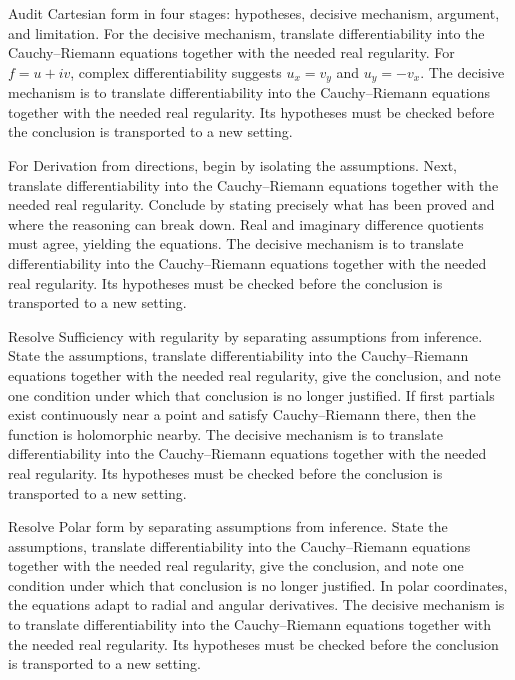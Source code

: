 \begin{example}\label{ex:iv02-worked-01}
Audit Cartesian form in four stages: hypotheses, decisive mechanism, argument, and limitation. For the decisive mechanism, translate differentiability into the Cauchy--Riemann equations together with the needed real regularity. For $f=u+iv$, complex differentiability suggests $u_x=v_y$ and $u_y=-v_x$. The decisive mechanism is to translate differentiability into the Cauchy--Riemann equations together with the needed real regularity. Its hypotheses must be checked before the conclusion is transported to a new setting.
\end{example}

\begin{example}\label{ex:iv02-worked-02}
For Derivation from directions, begin by isolating the assumptions. Next, translate differentiability into the Cauchy--Riemann equations together with the needed real regularity. Conclude by stating precisely what has been proved and where the reasoning can break down. Real and imaginary difference quotients must agree, yielding the equations. The decisive mechanism is to translate differentiability into the Cauchy--Riemann equations together with the needed real regularity. Its hypotheses must be checked before the conclusion is transported to a new setting.
\end{example}

\begin{example}\label{ex:iv02-worked-03}
Resolve Sufficiency with regularity by separating assumptions from inference. State the assumptions, translate differentiability into the Cauchy--Riemann equations together with the needed real regularity, give the conclusion, and note one condition under which that conclusion is no longer justified. If first partials exist continuously near a point and satisfy Cauchy–Riemann there, then the function is holomorphic nearby. The decisive mechanism is to translate differentiability into the Cauchy--Riemann equations together with the needed real regularity. Its hypotheses must be checked before the conclusion is transported to a new setting.
\end{example}

\begin{example}\label{ex:iv02-worked-04}
Resolve Polar form by separating assumptions from inference. State the assumptions, translate differentiability into the Cauchy--Riemann equations together with the needed real regularity, give the conclusion, and note one condition under which that conclusion is no longer justified. In polar coordinates, the equations adapt to radial and angular derivatives. The decisive mechanism is to translate differentiability into the Cauchy--Riemann equations together with the needed real regularity. Its hypotheses must be checked before the conclusion is transported to a new setting.
\end{example}

